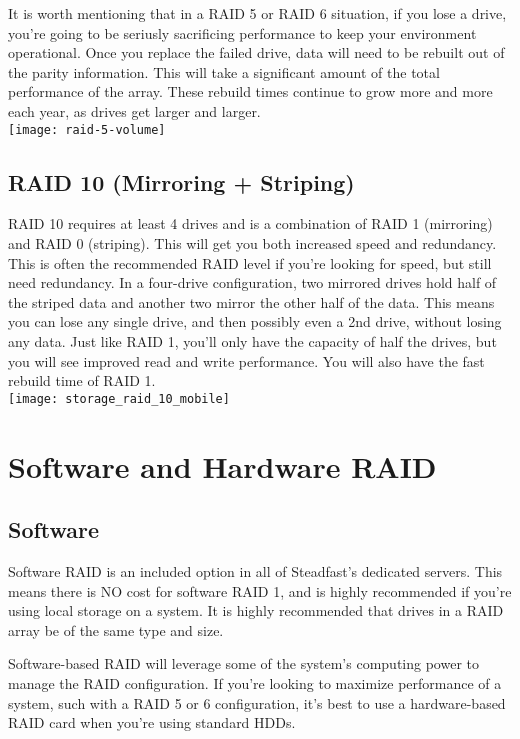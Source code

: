 \documentclass{article}
\begin{document}
It is worth mentioning that in a RAID 5 or RAID 6 situation, if you lose a drive, you’re going to be seriusly sacrificing performance to keep your environment operational. Once you replace the failed drive, data will need to be rebuilt out of the parity information. This will take a significant amount of the total performance of the array. These rebuild times continue to grow more and more each year, as drives get larger and larger.\\
\texttt{[image: raid-5-volume]} 


\subsection{RAID 10 (Mirroring + Striping)}
RAID 10 requires at least 4 drives and is a combination of RAID 1 (mirroring) and RAID 0 (striping). This will get you both increased speed and redundancy. This is often the recommended RAID level if you're looking for speed, but still need redundancy. In a four-drive configuration, two mirrored drives hold half of the striped data and another two mirror the other half of the data. This means you can lose any single drive, and then possibly even a 2nd drive, without losing any data. Just like RAID 1, you'll only have the capacity of half the drives, but you will see improved read and write performance. You will also have the fast rebuild time of RAID 1.\\
\texttt{[image: storage\_raid\_10\_mobile]} 


\section{Software and Hardware RAID}

\subsection{Software}
Software RAID is an included option in all of Steadfast’s dedicated servers. This means there is NO cost for software RAID 1, and is highly recommended if you’re using local storage on a system. It is highly recommended that drives in a RAID array be of the same type and size.

Software-based RAID will leverage some of the system’s computing power to manage the RAID configuration. If you’re looking to maximize performance of a system, such with a RAID 5 or 6 configuration, it’s best to use a hardware-based RAID card when you’re using standard HDDs.
\end{document}
